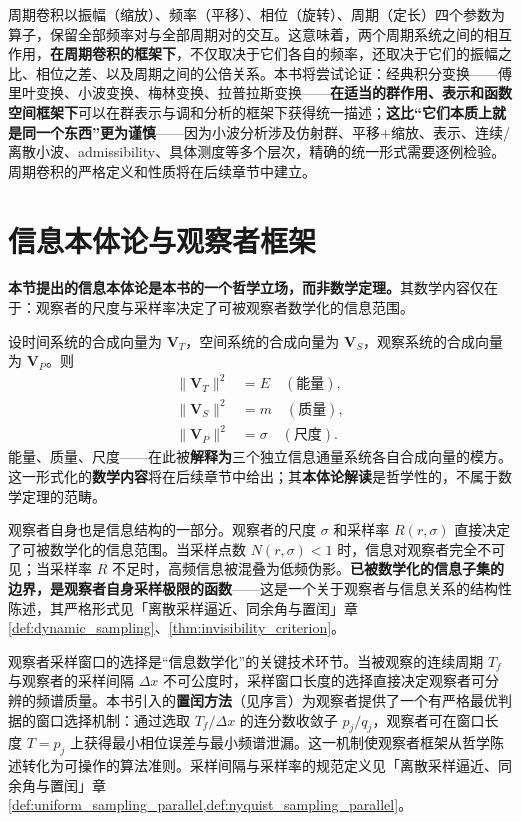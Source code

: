 周期卷积以振幅（缩放）、频率（平移）、相位（旋转）、周期（定长）四个参数为算子，保留全部频率对与全部周期对的交互。这意味着，两个周期系统之间的相互作用，\textbf{在周期卷积的框架下}，不仅取决于它们各自的频率，还取决于它们的振幅之比、相位之差、以及周期之间的公倍关系。本书将尝试论证：经典积分变换——傅里叶变换、小波变换、梅林变换、拉普拉斯变换——\textbf{在适当的群作用、表示和函数空间框架下}可以在群表示与调和分析的框架下获得统一描述；\textbf{这比“它们本质上就是同一个东西”更为谨慎}——因为小波分析涉及仿射群、平移+缩放、表示、连续/离散小波、admissibility、具体测度等多个层次，精确的统一形式需要逐例检验。周期卷积的严格定义和性质将在后续章节中建立。

\section*{信息本体论与观察者框架}

\textbf{本节提出的信息本体论是本书的一个哲学立场，而非数学定理。}其数学内容仅在于：观察者的尺度与采样率决定了可被观察者数学化的信息范围。

设时间系统的合成向量为 $\mathbf{V}_T$，空间系统的合成向量为 $\mathbf{V}_S$，观察系统的合成向量为 $\mathbf{V}_P$。则
\begin{align}
\|\mathbf{V}_T\|^2 &= E \quad (\text{能量}), \label{eq:energy}\\
\|\mathbf{V}_S\|^2 &= m \quad (\text{质量}), \label{eq:mass}\\
\|\mathbf{V}_P\|^2 &= \sigma \quad (\text{尺度}). \label{eq:scale}
\end{align}
能量、质量、尺度——在此被\textbf{解释为}三个独立信息通量系统各自合成向量的模方。这一形式化的\textbf{数学内容}将在后续章节中给出；其\textbf{本体论解读}是哲学性的，不属于数学定理的范畴。

观察者自身也是信息结构的一部分。观察者的尺度 $\sigma$ 和采样率 $R(r,\sigma)$ 直接决定了可被数学化的信息范围。当采样点数 $N(r,\sigma) < 1$ 时，信息对观察者完全不可见；当采样率 $R$ 不足时，高频信息被混叠为低频伪影。\textbf{已被数学化的信息子集的边界，是观察者自身采样极限的函数}——这是一个关于观察者与信息关系的结构性陈述，其严格形式见「离散采样逼近、同余角与置闰」章 \cref{def:dynamic_sampling}、\cref{thm:invisibility_criterion}。

观察者采样窗口的选择是“信息数学化”的关键技术环节。当被观察的连续周期 $T_f$ 与观察者的采样间隔 $\Delta x$ 不可公度时，采样窗口长度的选择直接决定观察者可分辨的频谱质量。本书引入的\textbf{置闰方法}（见序言）为观察者提供了一个有严格最优判据的窗口选择机制：通过选取 $T_f/\Delta x$ 的连分数收敛子 $p_j/q_j$，观察者可在窗口长度 $T = p_j$ 上获得最小相位误差与最小频谱泄漏。这一机制使观察者框架从哲学陈述转化为可操作的算法准则。采样间隔与采样率的规范定义见「离散采样逼近、同余角与置闰」章 \cref{def:uniform_sampling_parallel,def:nyquist_sampling_parallel}。


